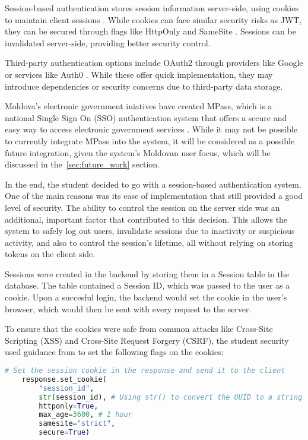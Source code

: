 Session-based authentication stores session information server-side, using cookies to maintain client sessions \parencite{auth1, auth2}. While cookies can face similar security risks as JWT, they can be secured through flags like HttpOnly and SameSite \parencite{mozilla}. Sessions can be invalidated server-side, providing better security control.

Third-party authentication options include OAuth2 through providers like Google \parencite{auth2, auth3} or services like Auth0 \parencite{auth0}. While these offer quick implementation, they may introduce dependencies or security concerns due to third-party data storage. 

Moldova's electronic government iniatives have created MPass, which is a national Single Sign On (SSO) authentication system that offers a secure and easy way to access electronic government services \parencite{mpass}. While it may not be possible to currently integrate MPass into the system, it will be considered as a possible future integration, given the system's Moldovan user focus, which will be discussed in the~\ref{sec:future_work} section.

In the end, the student decided to go with a session-based authentication system. One of the main reasons was its ease of implementation that still provided a good level of security. The ability to control the session on the server side was an additional, important factor that contributed to this decision. This allows the system to safely log out users, invalidate sessions due to inactivity or suspicious activity, and also to control the session's lifetime, all without relying on storing tokens on the client side.

Sessions were created in the backend by storing them in a Session table in the database. The table contained a Session ID, which was passed to the user as a cookie. Upon a succesful login, the backend would set the cookie in the user's browser, which would then be sent with every request to the server. 

To ensure that the cookies were safe from common attacks like Cross-Site Scripting (XSS) and Cross-Site Request Forgery (CSRF), the student security used guidance from \cite{owasp,mozilla} to set the following flags on the cookies:

\begin{lstlisting}[language=Python, caption=Session Cookie Flags]
    # Set the session cookie in the response and send it to the client
    response.set_cookie(
        "session_id",
        str(session_id), # Using str() to convert the UUID to a string
        httponly=True,
        max_age=3600, # 1 hour
        samesite="strict",
        secure=True)
\end{lstlisting}

